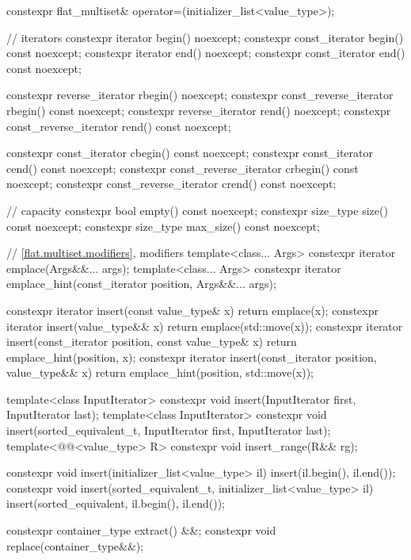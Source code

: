 \begin{codeblock}
{{    constexpr flat_multiset& operator=(initializer_list<value_type>);

    // iterators
    constexpr iterator               begin() noexcept;
    constexpr const_iterator         begin() const noexcept;
    constexpr iterator               end() noexcept;
    constexpr const_iterator         end() const noexcept;

    constexpr reverse_iterator       rbegin() noexcept;
    constexpr const_reverse_iterator rbegin() const noexcept;
    constexpr reverse_iterator       rend() noexcept;
    constexpr const_reverse_iterator rend() const noexcept;

    constexpr const_iterator         cbegin() const noexcept;
    constexpr const_iterator         cend() const noexcept;
    constexpr const_reverse_iterator crbegin() const noexcept;
    constexpr const_reverse_iterator crend() const noexcept;

    // capacity
    constexpr bool empty() const noexcept;
    constexpr size_type size() const noexcept;
    constexpr size_type max_size() const noexcept;

    // \ref{flat.multiset.modifiers}, modifiers
    template<class... Args> constexpr iterator emplace(Args&&... args);
    template<class... Args>
      constexpr iterator emplace_hint(const_iterator position, Args&&... args);

    constexpr iterator insert(const value_type& x)
      { return emplace(x); }
    constexpr iterator insert(value_type&& x)
      { return emplace(std::move(x)); }
    constexpr iterator insert(const_iterator position, const value_type& x)
      { return emplace_hint(position, x); }
    constexpr iterator insert(const_iterator position, value_type&& x)
      { return emplace_hint(position, std::move(x)); }

    template<class InputIterator>
      constexpr void insert(InputIterator first, InputIterator last);
    template<class InputIterator>
      constexpr void insert(sorted_equivalent_t, InputIterator first, InputIterator last);
    template<@@<value_type> R>
      constexpr void insert_range(R&& rg);

    constexpr void insert(initializer_list<value_type> il)
      { insert(il.begin(), il.end()); }
    constexpr void insert(sorted_equivalent_t, initializer_list<value_type> il)
      { insert(sorted_equivalent, il.begin(), il.end()); }

    constexpr container_type extract() &&;
    constexpr void replace(container_type&&);

}}
\end{codeblock}
